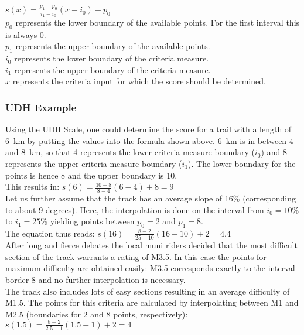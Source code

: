 \documentclass[a4paper,oneside]{scrartcl}
\begin{document}
$s(x) = \frac{p_1 - p_0}{i_1 - i_0} (x - i_0) + p_0$\\
%
$p_0$ represents the lower boundary of the available points. For the first interval this is always 0.\\
$p_1$ represents the upper boundary of the available points.\\
$i_0$ represents the lower boundary of the criteria measure.\\
$i_1$ represents the upper boundary of the criteria measure.\\
$x$ represents the criteria input for which the score should be determined.\\



\subsubsection{UDH Example}

Using the UDH Scale, one could determine the score for a trail with a length of
6~km by putting the values into the formula shown above. 6~km is in between 4 and
8~km, so that 4 represents the lower criteria measure boundary ($i_0$) and 8
represents the upper criteria measure boundary ($i_1$). The lower boundary for
the points is hence 8 and the upper boundary is 10.\\
This results in: $s(6) = \frac{10 - 8}{8 - 4} (6 - 4) + 8 = 9$\\

Let us further assume that the track has an average slope of 16\% (corresponding to about 9 degrees).
Here, the interpolation is done on the interval from $i_0 = 10\%$ to $i_1 = 25\%$ yielding points 
between $p_0 = 2$ and $p_1 = 8$. \\
The equation thus reads: $s(16) = \frac{8 - 2}{25 - 10} (16 - 10) + 2 = 4.4$\\

After long and fierce debates the local muni riders decided that the
most difficult section of the track warrants a rating of M3.5. 
In this case the points for maximum difficulty are obtained easily: 
M3.5 corresponds exactly to the interval border 8 and no further
interpolation is necessary. \\

The track also includes lots of easy sections resulting in an average difficulty
of M1.5. The points for this criteria are calculated by interpolating between M1 and M2.5
(boundaries for 2 and 8 points, respectively): 
$s(1.5) = \frac{8 - 2}{2.5 - 1} (1.5 - 1) + 2 = 4$\\
\end{document}
